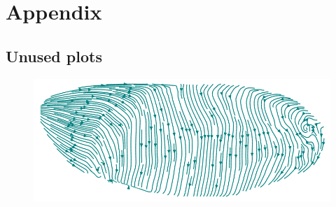 \chapter*{Appendix}
\section{Unused plots}
\label{App:Plots}
\begin{figure}[H]
    \centering
    \includegraphics[width=1\linewidth]{chapters/Appendix/streamplot1.png}
\end{figure}


